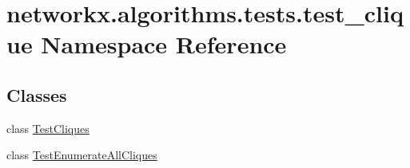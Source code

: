 \hypertarget{namespacenetworkx_1_1algorithms_1_1tests_1_1test__clique}{}\section{networkx.\+algorithms.\+tests.\+test\+\_\+clique Namespace Reference}
\label{namespacenetworkx_1_1algorithms_1_1tests_1_1test__clique}
\subsection*{Classes}
\begin{DoxyCompactItemize}
\item 
class \hyperlink{classnetworkx_1_1algorithms_1_1tests_1_1test__clique_1_1TestCliques}{Test\+Cliques}
\item 
class \hyperlink{classnetworkx_1_1algorithms_1_1tests_1_1test__clique_1_1TestEnumerateAllCliques}{Test\+Enumerate\+All\+Cliques}
\end{DoxyCompactItemize}
